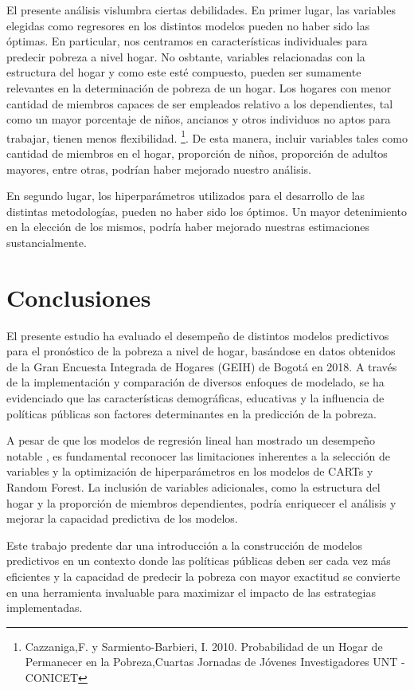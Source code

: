\documentclass[11pt, a4paper]{article}
\begin{document}
El presente análisis vislumbra ciertas debilidades.  En primer lugar, las variables elegidas como regresores en los distintos modelos pueden no haber sido las óptimas. En particular, nos centramos en características individuales para predecir pobreza a nivel hogar. No osbtante, variables relacionadas con la estructura del hogar y como este esté compuesto, pueden ser sumamente relevantes en la determinación de pobreza de un hogar.  Los hogares con menor cantidad de miembros capaces de ser empleados relativo a los dependientes, tal como un mayor porcentaje de niños, ancianos y otros individuos no aptos para trabajar, tienen menos flexibilidad. \footnote{Cazzaniga,F. y Sarmiento-Barbieri, I. 2010. Probabilidad de un Hogar de Permanecer en la Pobreza,Cuartas Jornadas de Jóvenes Investigadores UNT - CONICET}. De esta manera, incluir variables tales como cantidad de miembros en el hogar, proporción de niños, proporción de adultos mayores, entre otras, podrían haber mejorado nuestro análisis. 

En segundo lugar, los hiperparámetros utilizados para el desarrollo de las distintas metodologías, pueden no haber sido los óptimos. Un mayor detenimiento en la elección de los mismos, podría haber mejorado nuestras estimaciones sustancialmente. 


\section{Conclusiones}

El presente estudio ha evaluado el desempeño de distintos modelos predictivos para el pronóstico de la pobreza a nivel de hogar, basándose en datos obtenidos de la Gran Encuesta Integrada de Hogares (GEIH) de Bogotá en 2018. A través de la implementación y comparación de diversos enfoques de modelado, se ha evidenciado que las características demográficas, educativas y la influencia de políticas públicas son factores determinantes en la predicción de la pobreza.

A pesar de que los modelos de regresión lineal han mostrado un desempeño notable , es fundamental reconocer las limitaciones inherentes a la selección de variables y la optimización de hiperparámetros en los modelos de CARTs y Random Forest. La inclusión de variables adicionales, como la estructura del hogar y la proporción de miembros dependientes, podría enriquecer el análisis y mejorar la capacidad predictiva de los modelos.

Este trabajo predente dar una introducción a la construcción de modelos predictivos en un contexto donde las políticas públicas deben ser cada vez más eficientes y la capacidad de predecir la pobreza con mayor exactitud se convierte en una herramienta invaluable para maximizar el impacto de las estrategias implementadas. 
\end{document}
